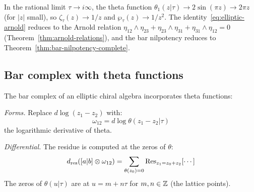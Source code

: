 \begin{remark}\label{rem:fay-to-arnold}
In the rational limit $\tau \to i\infty$, the theta function
$\theta_1(z|\tau) \to 2\sin(\pi z) \to 2\pi z$ (for $|z|$ small),
so $\zeta_\tau(z) \to 1/z$ and $\wp_\tau(z) \to 1/z^2$.
The identity~\eqref{eq:elliptic-arnold} reduces to the Arnold relation
$\eta_{12} \wedge \eta_{23} + \eta_{23} \wedge \eta_{31} +
\eta_{31} \wedge \eta_{12} = 0$
(Theorem~\ref{thm:arnold-relations}), and the
bar nilpotency reduces to
Theorem~\ref{thm:bar-nilpotency-complete}.
\end{remark}


\subsection{Bar complex with theta functions}

\begin{construction}\label{constr:elliptic-bar}
The bar complex of an elliptic chiral algebra incorporates theta functions:

\emph{Forms.} Replace $d\log(z_1 - z_2)$ with:
\[
\omega_{12} = d\log\theta(z_1 - z_2 | \tau)
\]
the logarithmic derivative of theta.

\emph{Differential.} The residue is computed at the zeros of $\theta$:
\[
d_{\text{res}}([a|b] \otimes \omega_{12}) = \sum_{\theta(z_0) = 0} \operatorname{Res}_{z_1 = z_0 + z_2}[\cdots]
\]
The zeros of $\theta(u|\tau)$ are at $u = m + n\tau$ for $m, n \in \mathbb{Z}$ (the lattice points).
\end{construction}

